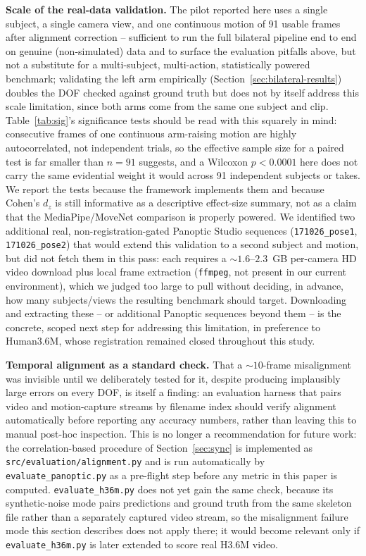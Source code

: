 \documentclass[conference]{IEEEtran}
\begin{document}
\textbf{Scale of the real-data validation.} The pilot reported here uses
a single subject, a single camera view, and one continuous motion of 91
usable frames after alignment correction -- sufficient to run the full
bilateral pipeline end to end on genuine (non-simulated) data and to
surface the evaluation pitfalls above, but not a substitute for a
multi-subject, multi-action, statistically powered benchmark; validating
the left arm empirically (Section~\ref{sec:bilateral-results}) doubles
the DOF checked against ground truth but does not by itself address this
scale limitation, since both arms come from the same one subject and
clip. Table~\ref{tab:sig}'s significance tests should be read with this
squarely in mind: consecutive frames of one continuous arm-raising
motion are highly autocorrelated, not independent trials, so the
effective sample size for a paired test is far smaller than $n=91$
suggests, and a Wilcoxon $p<0.0001$ here does not carry the same
evidential weight it would across 91 independent subjects or takes. We
report the tests because the framework implements them and because
Cohen's $d_z$ is still informative as a descriptive effect-size summary,
not as a claim that the MediaPipe/MoveNet comparison is properly
powered. We identified two additional real, non-registration-gated
Panoptic Studio sequences (\texttt{171026\_pose1}, \texttt{171026\_pose2})
that would extend this validation to a second subject and motion, but
did not fetch them in this pass: each requires a $\sim\!1.6$--$2.3$~GB
per-camera HD video download plus local frame extraction (\texttt{ffmpeg},
not present in our current environment), which we judged too large to
pull without deciding, in advance, how many subjects/views the resulting
benchmark should target. Downloading and extracting these -- or
additional Panoptic sequences beyond them -- is the concrete, scoped
next step for addressing this limitation, in preference to Human3.6M,
whose registration remained closed throughout this study.

\textbf{Temporal alignment as a standard check.} That a $\sim\!10$-frame
misalignment was invisible until we deliberately tested for it, despite
producing implausibly large errors on every DOF, is itself a finding: an
evaluation harness that pairs video and motion-capture streams by
filename index should verify alignment automatically before reporting
any accuracy numbers, rather than leaving this to manual post-hoc
inspection. This is no longer a recommendation for future work: the
correlation-based procedure of Section~\ref{sec:sync} is implemented as
\texttt{src/evaluation/alignment.py} and is run automatically by
\texttt{evaluate\_panoptic.py} as a pre-flight step before any metric in
this paper is computed. \texttt{evaluate\_h36m.py} does not yet gain the
same check, because its synthetic-noise mode pairs predictions and
ground truth from the same skeleton file rather than a separately
captured video stream, so the misalignment failure mode this section
describes does not apply there; it would become relevant only if
\texttt{evaluate\_h36m.py} is later extended to score real H3.6M video.
\end{document}

